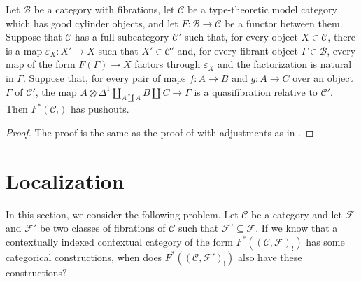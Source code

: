 \documentclass[reqno]{amsart}
\theoremstyle{definition}
\theoremstyle{remark}
\newcommand{\scat}[1]{\mathcal{#1}}
\newcommand{\Fib}{\mathcal{F}}
\numberwithin{figure}{section}
\begin{document}
\begin{lem}
Let $\scat{B}$ be a category with fibrations, let $\scat{C}$ be a type-theoretic model category which has good cylinder objects, and let $F : \scat{B} \to \scat{C}$ be a functor between them.
Suppose that $\scat{C}$ has a full subcategory $\scat{C}'$ such that, for every object $X \in \scat{C}$, there is a map $\varepsilon_X : X' \to X$ such that $X' \in \scat{C}'$ and,
for every fibrant object $\Gamma \in \scat{B}$, every map of the form $F(\Gamma) \to X$ factors through $\varepsilon_X$ and the factorization is natural in $\Gamma$.
Suppose that, for every pair of maps $f : A \to B$ and $g : A \to C$ over an object $\Gamma$ of $\scat{C}'$, the map $A \otimes \Delta^1 \amalg_{A \amalg A} B \amalg C \to \Gamma$ is a quasifibration relative to $\scat{C}'$.
Then $F^*(\scat{C}_!)$ has pushouts.
\end{lem}
\begin{proof}
The proof is the same as the proof of  with adjustments as in .
\end{proof}

\section{Localization}
\label{sec:loc}

In this section, we consider the following problem.
Let $\scat{C}$ be a category and let $\Fib$ and $\Fib'$ be two classes of fibrations of $\scat{C}$ such that $\Fib' \subseteq \Fib$.
If we know that a contextually indexed contextual category of the form $F^*((\scat{C},\Fib)_!)$ has some categorical constructions, when does $F^*((\scat{C},\Fib')_!)$ also have these constructions?

\end{document}
